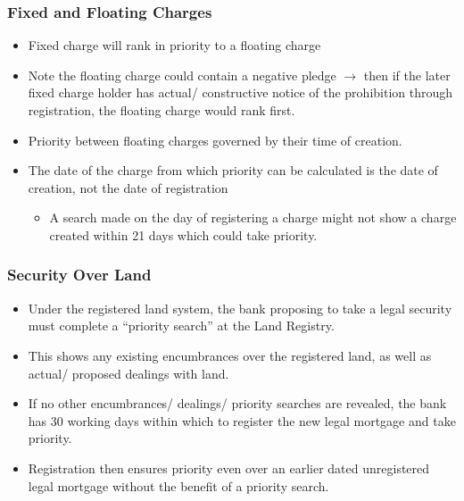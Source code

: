\documentclass[
]{article}
\providecommand{\tightlist}{%
  \setlength{\itemsep}{0pt}\setlength{\parskip}{0pt}}
\begin{document}
\hypertarget{fixed-and-floating-charges}{%
\subsubsection{Fixed and Floating
Charges}\label{fixed-and-floating-charges}}

\begin{itemize}
\tightlist
\item
  Fixed charge will rank in priority to a floating charge
\item
  Note the floating charge could contain a negative pledge
  {\(\rightarrow\)} then if the later fixed charge holder has actual/
  constructive notice of the prohibition through registration, the
  floating charge would rank first.
\item
  Priority between floating charges governed by their time of creation.
\item
  The date of the charge from which priority can be calculated is the
  date of creation, not the date of registration

  \begin{itemize}
  \tightlist
  \item
    A search made on the day of registering a charge might not show a
    charge created within 21 days which could take priority.
  \end{itemize}
\end{itemize}

\hypertarget{security-over-land}{%
\subsubsection{Security Over Land}\label{security-over-land}}

\begin{itemize}
\tightlist
\item
  Under the registered land system, the bank proposing to take a legal
  security must complete a ``priority search'' at the Land Registry.
\item
  This shows any existing encumbrances over the registered land, as well
  as actual/ proposed dealings with land.
\item
  If no other encumbrances/ dealings/ priority searches are revealed,
  the bank has 30 working days within which to register the new legal
  mortgage and take priority.
\item
  Registration then ensures priority even over an earlier dated
  unregistered legal mortgage without the benefit of a priority search.
\end{itemize}
\end{document}
